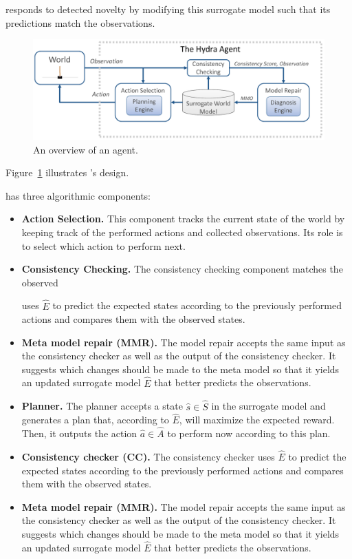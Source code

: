 responds to detected novelty by modifying this surrogate model such that its predictions match the observations.


\begin{figure}
\centering
\includegraphics[width=\columnwidth]{hydra-cropped.pdf}
\caption{An overview of an \hydra agent.}
\label{fig:hydra-overview}
\end{figure}

Figure~\ref{fig:hydra-overview} illustrates \hydra's design. 

\hydra has three algorithmic components:
\begin{itemize}


\item \textbf{Action Selection.} This component tracks the current state of the world by keeping track of the performed actions and collected observations. Its role is to select which action to perform next. 
\item \textbf{Consistency Checking.} The consistency checking component matches the observed

uses $\hat{E}$ to predict the expected states according to the previously performed actions and compares them with the observed states. 
\item \textbf{Meta model repair (MMR).} The model repair accepts the same input as the consistency checker as well as the output of the consistency checker. It suggests which changes should be made to the meta model so that it yields an updated surrogate model $\hat{E}$ that better predicts the observations. %

\item \textbf{Planner.} The planner accepts a state $\hat{s}\in\hat{S}$ in the surrogate model and generates a plan that, according to $\hat{E}$, will maximize the expected reward. Then, it outputs the action $\hat{a}\in\hat{A}$ to perform now according to this plan.
\item \textbf{Consistency checker (CC).} The consistency checker uses $\hat{E}$ to predict the expected states according to the previously performed actions and compares them with the observed states. 
\item \textbf{Meta model repair (MMR).} The model repair accepts the same input as the consistency checker as well as the output of the consistency checker. It suggests which changes should be made to the meta model so that it yields an updated surrogate model $\hat{E}$ that better predicts the observations. %
\end{itemize}







